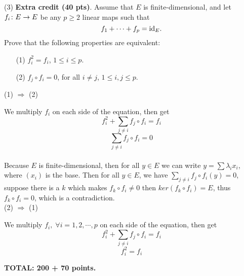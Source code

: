\documentclass[12pt]{article}
\begin{document}
\medskip\noindent
(3)
{\bf Extra credit (40 pts)\/}.
Assume that $E$ is finite-dimensional, and
let $f_i\colon E\rightarrow E$ be any 
$p\geq 2$ linear maps such that
\[
f_1 + \cdots + f_p  = {\rm id}_E.
\]
Prove that the following properties are equivalent:
\begin{enumerate}
\item[(1)]
$f_i^2 = f_i$, $1\leq i \leq p$.
\item[(2)]
$f_j \circ f_i =  0$, for all $i \not= j$, $1\leq i, j \leq p$.
\end{enumerate}

(1) $\Rightarrow$ (2) 

We multiply $f_i$ on each side of the equation, then get 
\[
f_i^2 + \sum_{j \neq i} f_j \circ f_i = f_i
\]
\[
 \sum_{j \neq i} f_j \circ f_i  = 0
\] \\

Because $E$ is finite-dimensional, then for all $y \in E$ we can write $y = \sum \lambda_i x_i$, where $(x_i)$ is the base. Then for all $y \in E$, we have $ \sum_{j \neq i} f_j \circ f_i (y) = 0$, suppose there is a $k$ which makes $ f_k \circ f_i \neq 0 $ then $ker( f_k \circ f_i ) = E$, thus $ f_k \circ f_i  = 0$, which is a contradiction. \\

(2) $\Rightarrow$ (1)

We multiply $f_i, \; \forall i = 1,2,\cdots, p$ on each side of the equation, then get 
\[
f_i^2 + \sum_{j \neq i} f_j \circ f_i = f_i
\]
\[
 f_i^2 = f_i
\]


\vspace{0.5cm}\noindent
{\bf TOTAL: 200  + 70 points.}
\end{document}
